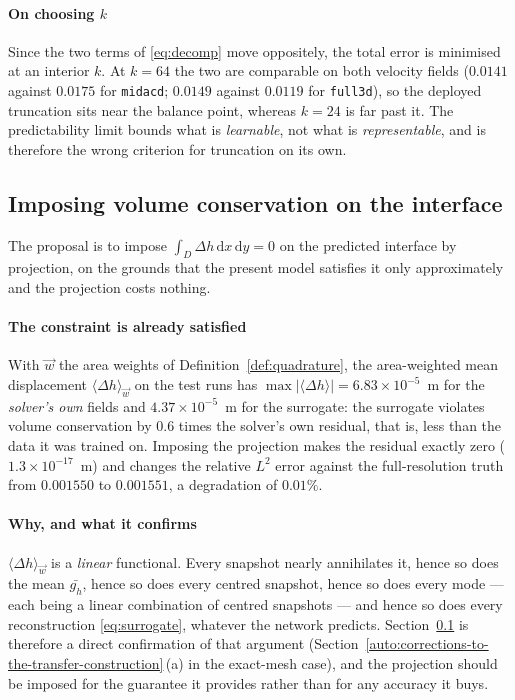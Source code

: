 \documentclass[11pt,a4paper]{article}
\theoremstyle{plain}
\theoremstyle{definition}
\theoremstyle{remark}
\begin{document}
\paragraph{On choosing $k$}
Since the two terms of \eqref{eq:decomp} move oppositely, the total error is
minimised at an interior $k$. At $k=64$ the two are comparable on both velocity
fields ($0.0141$ against $0.0175$ for \texttt{midacd}; $0.0149$ against
$0.0119$ for \texttt{full3d}), so the deployed truncation sits near the balance
point, whereas $k=24$ is far past it. The predictability limit bounds what is
\emph{learnable}, not what is \emph{representable}, and is therefore the wrong
criterion for truncation on its own.

\subsection{Imposing volume conservation on the interface}
\label{auto:imposing-volume-conservation-on-the-inte}

The proposal is to impose $\int_D \Delta h \,\mathrm{d}x\,\mathrm{d}y = 0$ on
the predicted interface by projection, on the grounds that the present model
satisfies it only approximately and the projection costs nothing.

\label{meas:volume}
\paragraph{The constraint is already satisfied}
With $\vec{w}$ the area weights of Definition~\ref{def:quadrature}, the
area-weighted mean displacement $\langle \Delta h\rangle_{\vec{w}}$ on the test
runs has $\max|\langle\Delta h\rangle| = 6.83\times10^{-5}$~m for the
\emph{solver's own} fields and $4.37\times10^{-5}$~m for the surrogate: the
surrogate violates volume conservation by $0.6$ times the solver's own residual,
that is, less than the data it was trained on. Imposing the projection makes the
residual exactly zero ($1.3\times10^{-17}$~m) and changes the relative $L^2$
error against the full-resolution truth from $0.001550$ to $0.001551$, a
degradation of $0.01\%$.

\paragraph{Why, and what it confirms}
$\langle \Delta h\rangle_{\vec{w}}$ is a \emph{linear} functional. Every
snapshot nearly annihilates it, hence so does the mean $\bar{g_h}$, hence so
does every centred snapshot, hence so does every mode --- each being a linear
combination of centred snapshots --- and hence so does every reconstruction
\eqref{eq:surrogate}, whatever the network predicts. Section~\ref{auto:imposing-volume-conservation-on-the-inte}
is therefore a direct confirmation of that argument
(Section~\ref{auto:corrections-to-the-transfer-construction}\,(a) in the exact-mesh case), and the projection should be
imposed for the guarantee it provides rather than for any accuracy it buys.
\end{document}
